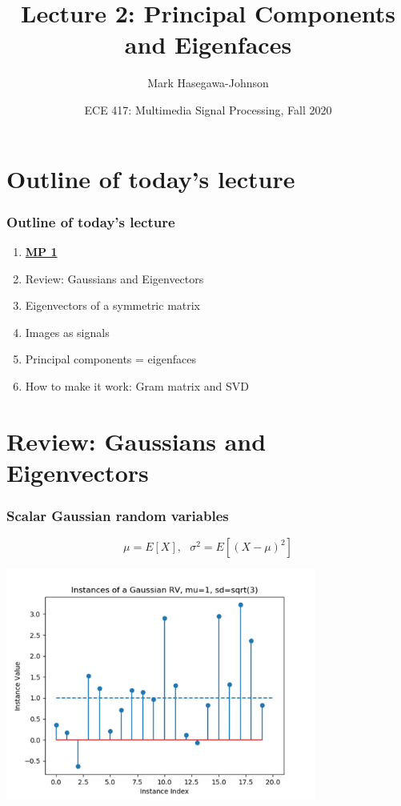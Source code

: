 \documentclass{beamer}
\title{Lecture 2: Principal Components and Eigenfaces}
\author{Mark Hasegawa-Johnson}
\date{ECE 417: Multimedia Signal Processing, Fall 2020}
\begin{document}
\begin{frame}
  \maketitle
\end{frame}

\begin{frame}
  \tableofcontents
\end{frame}

\section[Outline]{Outline of today's lecture}
\setcounter{subsection}{1}
\begin{frame}
  \frametitle{Outline of today's lecture}
  \begin{enumerate}
  \item \href{https://courses.engr.illinois.edu/ece417/fa2020/mp1.html}{\bf\color{blue}MP 1}
  \item Review: Gaussians and Eigenvectors
  \item Eigenvectors of a symmetric matrix
  \item Images as signals
  \item Principal components = eigenfaces
  \item How to make it work: Gram matrix and SVD
  \end{enumerate}
\end{frame}

\section[Review]{Review: Gaussians and Eigenvectors}
\setcounter{subsection}{1}

\begin{frame}
  \frametitle{Scalar Gaussian random variables}
  \[
  \mu=E[X],~~~\sigma^2=E[(X-\mu)^2]
  \]
  \centerline{\includegraphics[height=3in]{gaussian_instances.png}}
\end{frame}
\end{document}
